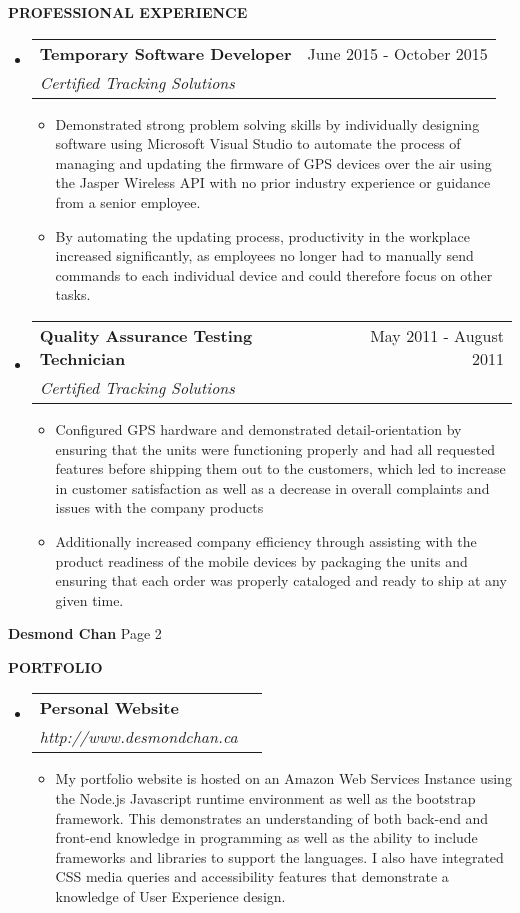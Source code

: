 \documentclass[letterpaper,11pt]{article}
\makeatletter
\newcommand{\resitem}[1]{\item #1 \vspace{-2pt}}
\newcommand{\resheading}[1]{{\large \colorbox{mygrey}{\begin{minipage}{\textwidth}{\textbf{#1 \vphantom{p\^{E}}}}\end{minipage}}}}
\newcommand{\ressubheading}[4]{
\begin{tabular*}{7.0in}{l@{\extracolsep{\fill}}r}
		\textbf{#1} & #2 \\
		\textit{#3} & \textit{#4} \\
\end{tabular*}\vspace{-6pt}}
\makeatother
\begin{document}
\resheading{PROFESSIONAL EXPERIENCE}
\begin{itemize}
\item
\ressubheading{Temporary Software Developer}{June 2015 - October 2015}{Certified Tracking Solutions}{}
\begin{itemize}
	\resitem{Demonstrated strong problem solving skills by individually designing software using Microsoft Visual Studio to automate the process of managing and updating the firmware of GPS devices over the air using the Jasper Wireless API with no prior industry experience or guidance from a senior employee.}
	\resitem{By automating the updating process, productivity in the workplace increased significantly, as employees no longer had to manually send commands to each individual device and could therefore focus on other tasks.}
\end{itemize}
\item
	\ressubheading{Quality Assurance Testing Technician}{May 2011 - August 2011}{Certified Tracking Solutions}{}
	\begin{itemize}
		\resitem{Configured GPS hardware and demonstrated detail-orientation by ensuring that the units were functioning properly and had all requested features before shipping them out to the customers, which led to increase in customer satisfaction as well as a decrease in overall complaints and issues with the company products}
		\resitem {Additionally increased company efficiency through assisting with the product readiness of the mobile devices by packaging the units and ensuring that each order was properly cataloged and ready to ship at any given time.}

	\end{itemize}






\end{itemize}


\newpage
\begin{center}
\textbf{\large Desmond Chan}  Page 2\\
\end{center}

\resheading{PORTFOLIO}
\begin{itemize}
\item
	\ressubheading{Personal Website}{}{http://www.desmondchan.ca}{}
	\begin{itemize}
	\resitem{ My portfolio website is hosted on an Amazon Web Services Instance using the Node.js Javascript runtime environment as well as the bootstrap framework. This demonstrates an understanding of both back-end and front-end knowledge in programming as well as the ability to include frameworks and libraries to support the languages. I also have integrated CSS media queries and accessibility features that demonstrate a knowledge of User Experience design.}
	\end{itemize}

\end{itemize}
\end{document}
